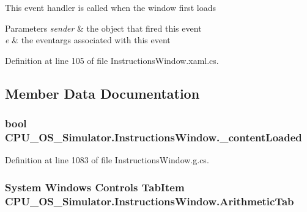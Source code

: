 This event handler is called when the window first loads 


\begin{DoxyParams}{Parameters}
{\em sender} & the object that fired this event\\
\hline
{\em e} & the eventargs associated with this event\\
\hline
\end{DoxyParams}


Definition at line 105 of file Instructions\+Window.\+xaml.\+cs.



\subsection{Member Data Documentation}
\hypertarget{class_c_p_u___o_s___simulator_1_1_instructions_window_a7755282dffea134038e9e58c931dc297}{}
\subsubsection[{\+\_\+content\+Loaded}]{\setlength{\rightskip}{0pt plus 5cm}bool C\+P\+U\+\_\+\+O\+S\+\_\+\+Simulator.\+Instructions\+Window.\+\_\+content\+Loaded\hspace{0.3cm}{\ttfamily [private]}}\label{class_c_p_u___o_s___simulator_1_1_instructions_window_a7755282dffea134038e9e58c931dc297}


Definition at line 1083 of file Instructions\+Window.\+g.\+cs.

\hypertarget{class_c_p_u___o_s___simulator_1_1_instructions_window_aabf61d7cbf8be85bb4ab0ef2d0614b46}{}
\subsubsection[{Arithmetic\+Tab}]{\setlength{\rightskip}{0pt plus 5cm}System Windows Controls Tab\+Item C\+P\+U\+\_\+\+O\+S\+\_\+\+Simulator.\+Instructions\+Window.\+Arithmetic\+Tab\hspace{0.3cm}{\ttfamily [package]}}\label{class_c_p_u___o_s___simulator_1_1_instructions_window_aabf61d7cbf8be85bb4ab0ef2d0614b46}



